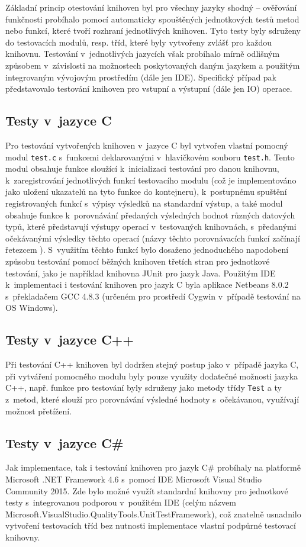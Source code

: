 \documentclass[czech,BP]{thesiskiv}
\begin{document}
Základní princip otestování knihoven byl pro všechny jazyky shodný -- ověřování funkčnosti probíhalo pomocí automaticky spouštěných jednotkových testů metod nebo funkcí, které tvoří rozhraní jednotlivých knihoven. Tyto testy byly sdruženy do testovacích modulů, resp. tříd, které byly vytvořeny zvlášť pro každou knihovnu. Testování v~jednotlivých jazycích však probíhalo mírně odlišným způsobem v~závislosti na možnostech poskytovaných daným jazykem a použitým integrovaným vývojovým prostředím (dále jen IDE). Specifický případ pak představovalo testování knihoven pro vstupní a výstupní (dále jen IO) operace.

\subsection{Testy v~jazyce C}
Pro testování vytvořených knihoven v~jazyce C byl vytvořen vlastní pomocný modul \texttt{test.c} s~funkcemi deklarovanými v~hlavičkovém souboru \texttt{test.h}. Tento modul obsahuje funkce sloužící k~inicializaci testování pro danou knihovnu, k~zaregistrování jednotlivých funkcí testovacího modulu (což je implementováno jako uložení ukazatelů na tyto funkce do kontejneru), k~postupnému spuštění registrovaných funkcí s~výpisy výsledků na standardní výstup, a také modul obsahuje funkce k~porovnávání předaných výsledných hodnot různých datových typů, které představují výstupy operací v~testovaných knihovnách, s~předanými očekávanými výsledky těchto operací (názvy těchto porovnávacích funkcí začínají řetezcem ). S~využitím těchto funkcí bylo dosaženo jednoduchého napodobení způsobu testování pomocí běžných knihoven třetích stran pro jednotkové testování, jako je například knihovna JUnit pro jazyk Java. Použitým IDE k~implementaci i testování knihoven pro jazyk C byla aplikace Netbeans 8.0.2 s~překladačem GCC 4.8.3 (určeném pro prostředí Cygwin v~případě testování na OS Windows).

\subsection{Testy v~jazyce C++}
Při testování C++ knihoven byl dodržen stejný postup jako v~případě jazyka C, při vytváření pomocného modulu byly pouze využity dodatečné možnosti jazyka C++, např. funkce pro testování byly sdruženy jako metody třídy \texttt{Test} a ty z~metod, které slouží pro porovnávání výsledné hodnoty s~očekávanou, využívají možnost přetížení.

\subsection{Testy v~jazyce C\#}
Jak implementace, tak i testování knihoven pro jazyk C\# probíhaly na platformě Microsoft .NET Framework 4.6 s~pomocí IDE Microsoft Visual Studio Community 2015. Zde bylo možné využít standardní knihovny pro jednotkové testy s~integrovanou podporou v~použitém IDE (celým názvem Microsoft.VisualStudio.QualityTools.UnitTestFramework), což znatelně usnadnilo vytvoření testovacích tříd bez nutnosti implementace vlastní podpůrné testovací knihovny.
\end{document}
